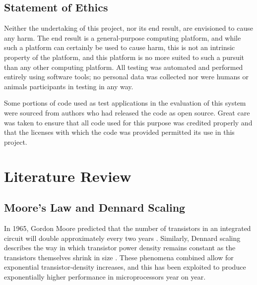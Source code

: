 \documentclass{UoYCSproject}
\begin{document}
\section{Statement of Ethics}

Neither the undertaking of this project, nor its end result, are envisioned to cause any harm. The end result is
a general-purpose computing platform, and while such a platform can certainly be used to cause harm, this is not an intrinsic
property of the platform, and this platform is no more suited to such a pursuit than any other computing platform.
All testing was automated and performed entirely using software tools; no personal data was collected nor were humans
or animals participants in testing in any way.

Some portions of code used as test applications in the evaluation of this system were sourced
from authors who had released the code as open source. Great care was taken to ensure that all
code used for this purpose was credited properly and that the licenses with which the code was
provided permitted its use in this project.

\chapter{Literature Review}

\section{Moore's Law and Dennard Scaling}

In 1965, Gordon Moore predicted that the number of transistors in an integrated circuit will double
approximately every two years  \cite{moore}. Similarly, Dennard scaling describes the way in which transistor power density
remains constant as the transistors themselves shrink in size \cite{dennard}. These phenomena combined allow for exponential
transistor-density increases, and this has been exploited to produce exponentially higher performance in
microprocessors year on year.
\end{document}
